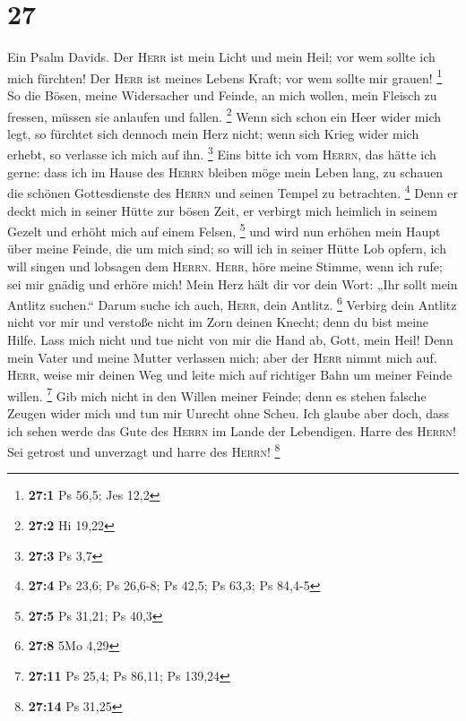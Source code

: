 \hypertarget{section-12}{%
\section{27}\label{section-12}}

 Ein Psalm Davids. Der \textsc{Herr} ist mein Licht und
mein Heil; vor wem sollte ich mich fürchten! Der \textsc{Herr} ist
meines Lebens Kraft; vor wem sollte mir grauen! \footnote{\textbf{27:1}
  Ps 56,5; Jes 12,2}  So die Bösen, meine Widersacher und
Feinde, an mich wollen, mein Fleisch zu fressen, müssen sie anlaufen und
fallen. \footnote{\textbf{27:2} Hi 19,22}  Wenn sich schon
ein Heer wider mich legt, so fürchtet sich dennoch mein Herz nicht; wenn
sich Krieg wider mich erhebt, so verlasse ich mich auf ihn. \footnote{\textbf{27:3}
  Ps 3,7}  Eins bitte ich vom \textsc{Herrn}, das hätte
ich gerne: dass ich im Hause des \textsc{Herrn} bleiben möge mein Leben
lang, zu schauen die schönen Gottesdienste des \textsc{Herrn} und seinen
Tempel zu betrachten. \footnote{\textbf{27:4} Ps 23,6; Ps 26,6-8; Ps
  42,5; Ps 63,3; Ps 84,4-5}  Denn er deckt mich in seiner
Hütte zur bösen Zeit, er verbirgt mich heimlich in seinem Gezelt und
erhöht mich auf einem Felsen, \footnote{\textbf{27:5} Ps 31,21; Ps 40,3}
 und wird nun erhöhen mein Haupt über meine Feinde, die um
mich sind; so will ich in seiner Hütte Lob opfern, ich will singen und
lobsagen dem \textsc{Herrn}.  \textsc{Herr}, höre meine
Stimme, wenn ich rufe; sei mir gnädig und erhöre mich! 
Mein Herz hält dir vor dein Wort: „Ihr sollt mein Antlitz suchen.``
Darum suche ich auch, \textsc{Herr}, dein Antlitz. \footnote{\textbf{27:8}
  5Mo 4,29}  Verbirg dein Antlitz nicht vor mir und
verstoße nicht im Zorn deinen Knecht; denn du bist meine Hilfe. Lass
mich nicht und tue nicht von mir die Hand ab, Gott, mein Heil!
 Denn mein Vater und meine Mutter verlassen mich; aber
der \textsc{Herr} nimmt mich auf.  \textsc{Herr}, weise
mir deinen Weg und leite mich auf richtiger Bahn um meiner Feinde
willen. \footnote{\textbf{27:11} Ps 25,4; Ps 86,11; Ps 139,24}
 Gib mich nicht in den Willen meiner Feinde; denn es
stehen falsche Zeugen wider mich und tun mir Unrecht ohne Scheu.
 Ich glaube aber doch, dass ich sehen werde das Gute des
\textsc{Herrn} im Lande der Lebendigen.  Harre des
\textsc{Herrn}! Sei getrost und unverzagt und harre des \textsc{Herrn}!
\footnote{\textbf{27:14} Ps 31,25}

